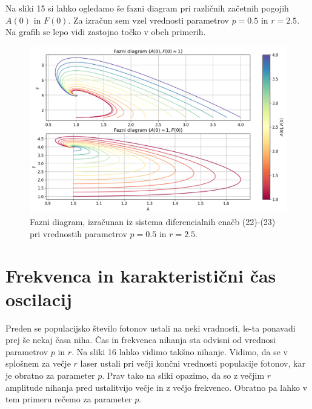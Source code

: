 \documentclass[slovene,11pt,a4paper]{article}
\begin{document}
Na sliki 15 si lahko ogledamo še fazni diagram pri različnih začetnih pogojih $A(0)$ in $F(0)$. Za izračun sem vzel vrednosti parametrov $p=0.5$ in $r=2.5$. Na grafih se lepo vidi zastojno točko v obeh primerih.

\begin{figure}[h!]
\centering
\includegraphics[width=13.5cm]{laser2.png}
\caption{Fazni diagram, izračunan iz sistema diferencialnih enačb (22)-(23) pri vrednostih parametrov $p = 0.5$ in $r = 2.5$.}
\end{figure}

\section{Frekvenca in karakteristični čas oscilacij}

Preden se populacijsko število fotonov ustali na neki vradnosti, le-ta ponavadi prej še nekaj časa niha. Čas in frekvenca nihanja sta odvisni od vrednosi parametrov $p$ in $r$. Na sliki 16 lahko vidimo takšno nihanje. Vidimo, da se v splošnem za večje $r$ laser ustali pri večji končni vrednosti populacije fotonov, kar je obratno za parameter $p$. Prav tako na sliki opazimo, da so z večjim $r$ amplitude nihanja pred ustalitvijo večje in z večjo frekvenco. Obratno pa lahko v tem primeru rečemo za parameter $p$.
\end{document}
